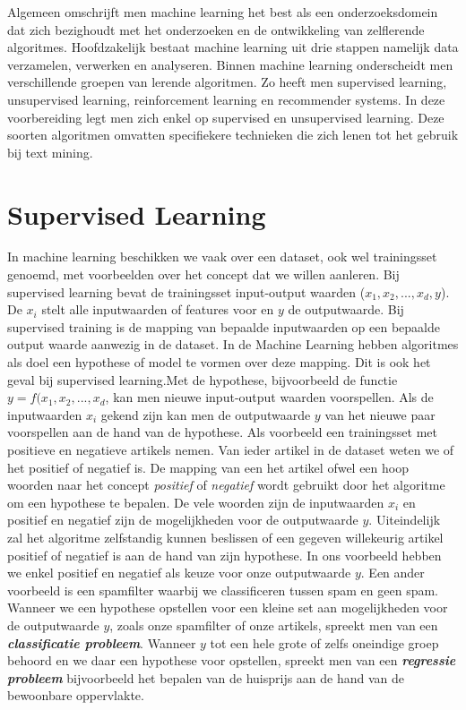 Algemeen omschrijft men machine learning het best als een onderzoeksdomein dat zich bezighoudt met het onderzoeken en de ontwikkeling van zelflerende algoritmes. Hoofdzakelijk bestaat machine learning uit drie stappen namelijk data verzamelen, verwerken en analyseren.
\newline
Binnen machine learning onderscheidt men verschillende groepen van lerende algoritmen. Zo heeft men supervised learning, unsupervised learning, reinforcement learning en recommender systems. In deze voorbereiding legt men zich enkel op supervised en unsupervised learning. Deze soorten algoritmen omvatten specifiekere technieken die zich lenen tot het gebruik bij text mining.


\section{Supervised Learning}\label{Supervised Learning}

In machine learning beschikken we vaak over een dataset, ook wel trainingsset genoemd, met voorbeelden over het concept dat we willen aanleren. Bij supervised learning bevat de trainingsset input-output waarden ($x_{1},x_{2},...,x_{d},y$). De $x_{i}$ stelt alle inputwaarden of features voor en $y$ de outputwaarde. Bij supervised training is de mapping van bepaalde inputwaarden op een bepaalde output waarde aanwezig in de dataset. In de Machine Learning hebben algoritmes als doel een hypothese of model te vormen over deze mapping. Dit is ook het geval bij supervised learning.Met de hypothese, bijvoorbeeld de functie $y=f(x_{1},x_{2},...,x_{d}$, kan men nieuwe input-output waarden voorspellen. Als de inputwaarden $x_{i}$ gekend zijn kan men de outputwaarde $y$ van het nieuwe paar voorspellen aan de hand van de hypothese.  
\newline
Als voorbeeld een trainingsset met positieve en negatieve artikels nemen. Van ieder artikel in de dataset weten we of het positief of negatief is. De mapping van een het artikel ofwel een hoop woorden naar het concept \textit{positief} of \textit{negatief} wordt gebruikt door het algoritme om een hypothese te bepalen. De vele woorden zijn de inputwaarden $x_{i}$ en positief en negatief zijn de mogelijkheden voor de outputwaarde $y$. Uiteindelijk zal het algoritme zelfstandig kunnen beslissen of een gegeven willekeurig artikel positief of negatief is aan de hand van zijn hypothese.
\newline
In ons voorbeeld hebben we enkel positief en negatief als keuze voor onze outputwaarde $y$. Een ander voorbeeld is een spamfilter waarbij we classificeren tussen spam en geen spam. Wanneer we een hypothese opstellen voor een kleine set aan mogelijkheden voor de outputwaarde $y$, zoals onze spamfilter of onze artikels, spreekt men van een \textbf{\textit{classificatie probleem}}. Wanneer $y$ tot een hele grote of zelfs oneindige groep behoord en we daar een hypothese voor opstellen, spreekt men van een \textbf{\textit{regressie probleem}} bijvoorbeeld het bepalen van de huisprijs aan de hand van de bewoonbare oppervlakte.

